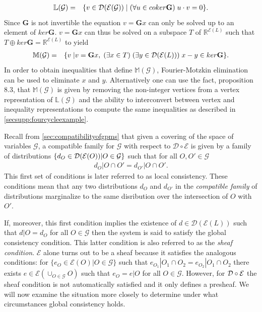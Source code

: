 \begin{eqnarray}\label{eq:localpolytope}
\mathbb{L}(\mathcal{G}) &=& \{ v \in \mathcal{D}{}(\mathcal{E}{}(\mathcal{G})) \; | \; (\forall u \in coker \mathbf{G}) \; u \cdot v = 0\}.
\end{eqnarray}
Since $\mathbf{G}$ is not invertible the equation $v = \mathbf{G}x$ can only be solved up to an element of $ker \mathbf{G}$. $v = \mathbf{G}x$ can thus be solved on a subspace $T$ of $\mathbb{R}^{\mathcal{E}(L)}$ such that $T \oplus ker \mathbf{G} = \mathbb{R}^{\mathcal{E}(L)}$ to yield
\begin{eqnarray}\label{eq:globalpolytope}
\mathbb{M}(\mathcal{G}) &=& \{ v \; | v = \mathbf{G} x,\; (\exists x \in T) \; (\exists y \in \mathcal{D}{}(\mathcal{E}{}(L)))\; x-y \in ker \mathbf{G}  \}.
\end{eqnarray}
In order to obtain inequalities that define $\mathbb{M}(\mathcal{G})$, Fourier-Motzkin elimination can be used to eliminate $x$ and $y$. Alternatively one can use the fact, \cite{Wainwright2007} proposition 8.3, that $\mathbb{M}(\mathcal{G})$ is given by removing the non-integer vertices from a vertex represntation of $\mathbb{L}(\mathcal{G})$ and the ability to interconvert between vertex and inequality representations to compute the same inequalities as described in  \autoref{secsupp:fourcycleexample}.

Recall from \autoref{sec:compatibilityofgpms} that given a covering of the space of variables $\mathcal{G}$, a compatible family for $\mathcal{G}$ with respect to $\mathcal{D} \circ \mathcal{E}$ is given by a family of distributions $\{d_O \in \mathcal{D} (\mathcal{E}(O)) | O \in \mathcal{G}\}$ such that for all $O, O' \in \mathcal{G}$
\begin{eqnarray}
d_O|O \cap O' = d_{O'}|O \cap O'.
\end{eqnarray}
This first set of conditions is later referred to as local consistency. These conditions mean that any two distributions $d_O$ and $d_{O'}$ in the \emph{compatible family} of distributions marginalize to the same disribution over the intersection of $O$ with $O'$.

If, moreover, this first condition implies the existence of $d \in \mathcal{D}( \mathcal{E}(L))$ such that $d|O = d_O$ for all $O \in \mathcal{G}$ then the system is said to satisfy the global consistency condition.  This latter condition is also referred to as the \emph{sheaf condition}.  $\mathcal{E}$ alone turns out to be a sheaf because it satisfies the analogous conditions: for $\{e_O \in \mathcal{E}(O) | O \in \mathcal{G}\}$ such that $e_{O_{1}} | O_1 \cap O_2 = e_{O_{2}} | O_1 \cap O_2$ there exists $e \in \mathcal{E}(\cup_{O \in \mathcal{G}} O)$ such that $e_O = e|O$ for all $O \in \mathcal{G}$.  However, for $\mathcal{D} \circ \mathcal{E}$ the sheaf condition is not automatically satisfied and it only defines a presheaf.  We will now examine the situation more closely to determine under what circumstances global consistency holds.

